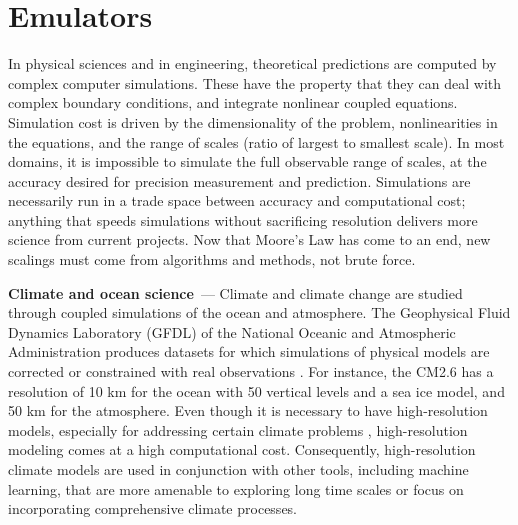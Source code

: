 \documentclass[10pt]{article}
\renewcommand{\paragraph}[1]{\smallskip\par\noindent\textbf{#1}~---}
\begin{document}
\section{Emulators}
In physical sciences and in engineering, theoretical predictions are computed by complex computer simulations.
These have the property that they can deal with complex boundary conditions, and integrate nonlinear coupled equations.
Simulation cost is driven by the dimensionality of the problem, nonlinearities in the equations, and the range of scales (ratio of largest to smallest scale).
In most domains, it is impossible to simulate the full observable range of scales, at the accuracy desired for precision measurement and prediction.
Simulations are necessarily run in a trade space between accuracy and computational cost; anything that speeds simulations without sacrificing resolution delivers more science from current projects.
Now that Moore's Law has come to an end, new scalings must come from algorithms and methods, not brute force.

\paragraph{Climate and ocean science}
Climate and climate change are studied through coupled simulations of the ocean and atmosphere.
The Geophysical Fluid Dynamics Laboratory (GFDL) of the National Oceanic and Atmospheric Administration produces datasets for which simulations of physical models are corrected or constrained with real observations \cite{obrien2004gfdl, rutledge2006nomads, delworth2020spear}. 
For instance, the CM2.6 has a resolution of 10 km for the ocean with 50 vertical levels and a sea ice model, and 50 km for the atmosphere. 
Even though it is necessary to have high-resolution models, especially for addressing certain climate problems \cite{jong2023increases, pascale2020increasing, zhou2019toward}, high-resolution modeling comes at a high computational cost. Consequently, high-resolution climate models are used in conjunction with other tools, including machine learning, that are more amenable to exploring long time scales or focus on incorporating comprehensive climate processes.
\end{document}
